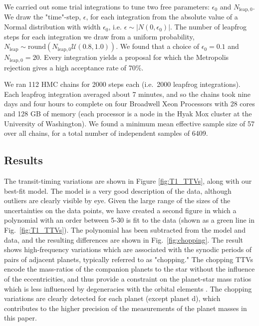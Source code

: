 \documentclass[fleqn,usenatbib]{mnras} %
\begin{document}
We carried out some trial integrations to tune two free parameters:  $\epsilon_0$ and $N_{\mathrm{leap},0}$.  We draw the "time"-step, $\epsilon$, for each integration from the absolute value of a Normal distribution with width $\epsilon_0$, i.e. $\epsilon \sim \vert N(0,\epsilon_0) \vert$.
The number of leapfrog steps for each integration we draw from a uniform probability,
$N_\mathrm{leap} \sim \mathrm{round}(N_{\mathrm{leap},0} \mathcal{U}(0.8,1.0))$.  We found that a choice of $\epsilon_0 = 0.1$
and $N_{\mathrm{leap},0} = 20$.  Every integration yields a proposal for which the Metropolis rejection gives a high acceptance rate of 70\%.  

We ran 112 HMC chains for 2000 steps each (i.e.\ 2000 leapfrog integrations).   Each leapfrog integration averaged about 7 minutes, and so the chains took nine
days and four hours to complete on four Broadwell Xeon Processors with 28 cores and  128 GB of memory (each processor is a node in the Hyak Mox cluster at the University of Washington).
We found a minimum mean effective sample size of 57 over all chains, for a 
total number of independent samples of 6409.

\subsection{Results}

The transit-timing variations are shown in Figure \ref{fig:T1_TTVs}, along
with our best-fit model.  The model is a very good description of the data,
although outliers are clearly visible by eye.  Given the large range of
the sizes of the uncertainties on the data points, we have created a
second figure in which a polynomial with an order between 5-30 is fit to
the data (shown as a green line in Fig.\ \ref{fig:T1_TTVs}).  The polynomial
has been subtracted from the model and data, and the resulting differences 
are shown in Fig.\ \ref{fig:chopping}.  The result shows high-frequency variations which are
associated with the synodic periods of pairs of adjacent planets, typically
referred to as "chopping."  The chopping TTVs encode the mass-ratios of
the companion planets to the star without the influence of the eccentricities,
and thus provide a constraint on the planet-star mass ratios which is less
influenced by degeneracies with the orbital elements \citep{Deck2015}.  The 
chopping variations are clearly detected for each planet
(except planet d), which contributes to the higher
precision of the measurements of the planet
masses in this paper.
\end{document}
